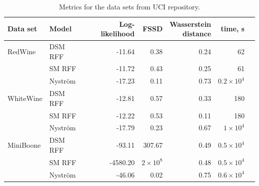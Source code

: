 \begin{table}
\centering
\caption{Metrics for the data sets from UCI repository.}
\label{tab:metrics}
  \footnotesize
  \begin{tabular}{llrrrrr}
    \toprule
    Data set & Model & Log-likelihood & FSSD &
    \shortstack{Wasserstein \\ distance} & time, s \\
    \midrule
    RedWine & DSM RFF     & -11.64 & 0.38 & 0.24 & 62 \\
            & SM RFF      & -11.72 & 0.43 & 0.25 & 61 \\
            & Nystr\"om   & -17.23 & 0.11 & 0.73 & $0.2 \times 10^4$ \\
    WhiteWine & DSM RFF   & -12.81 & 0.57 & 0.33 & 180 \\
              & SM RFF    & -12.22 & 0.53 & 0.11 & 180 \\
              & Nystr\"om & -17.79 & 0.23 & 0.67 & $1 \times 10^4$ \\
    MiniBoone & DSM RFF   & -93.11 & 307.67 & 0.49 & $0.5 \times 10^4$ \\
              & SM RFF    & -4580.20 & $2 \times 10^8$ & 0.48 & $0.5 \times 10^4$ \\
              & Nystr\"om & -46.06 & 0.02 &  0.75 & $0.6 \times 10^4$ \\
    \bottomrule
  \end{tabular}
\end{table}